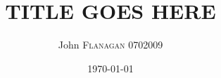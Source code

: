 \documentclass[pdftex,12pt,a4paper]{report}
\author{John \textsc{Flanagan} 0702009 }
\title{TITLE GOES HERE}
\date{\today}
\begin{document}



\pagebreak

\tableofcontents
\pagebreak


\pagebreak



\pagebreak


\pagebreak


\pagebreak


\pagebreak


\pagebreak



\nocite{*}
\end{document}
